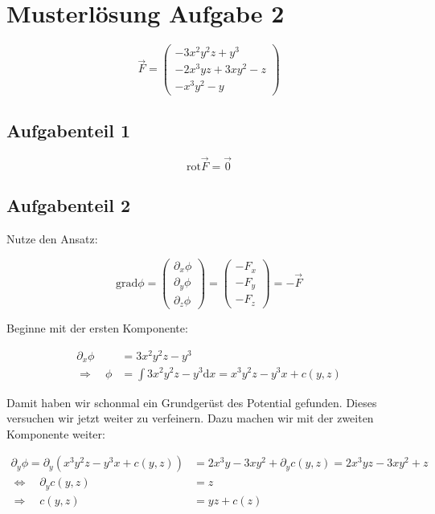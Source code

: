 \section{Musterlösung Aufgabe 2}
\begin{equation*}
\vec{F}=\begin{pmatrix} -3x^2y^2z+y^3 \\ -2x^3yz+3xy^2-z \\ -x^3y^2-y\end{pmatrix}
\end{equation*}

\subsection{Aufgabenteil 1}

\begin{equation*}
\mathrm{rot}\vec{F}=\vec{0}
\end{equation*}

\subsection{Aufgabenteil 2}

Nutze den Ansatz:

\begin{equation*}
\mathrm{grad}\phi=\begin{pmatrix} \partial_x \phi \\ \partial_y \phi \\ \partial_z \phi \end{pmatrix} =\begin{pmatrix} -F_x \\ -F_y \\ -F_z \end{pmatrix}=-\vec{F}
\end{equation*}

Beginne mit der ersten Komponente:

\begin{align*}
\partial_x \phi&=3x^2y^2z-y^3 \\
\Rightarrow \quad  \phi&=\int 3x^2y^2z-y^3 \mathrm{d}x = x^3y^2z-y^3x+c(y,z)
\end{align*}

Damit haben wir schonmal ein Grundgerüst des Potential gefunden.
Dieses versuchen wir jetzt weiter zu verfeinern.
Dazu machen wir mit der zweiten Komponente weiter:

\begin{align*}
\partial_y \phi= \partial_y\left( x^3y^2z-y^3x+c(y,z)\right)&=2x^3y-3xy^2+\partial_y c(y,z)= 2x^3yz-3xy^2+z \\
\Leftrightarrow \quad \partial_y c(y,z)&=z\\
\Rightarrow \quad c(y,z)&=yz+c(z)
\end{align*}


